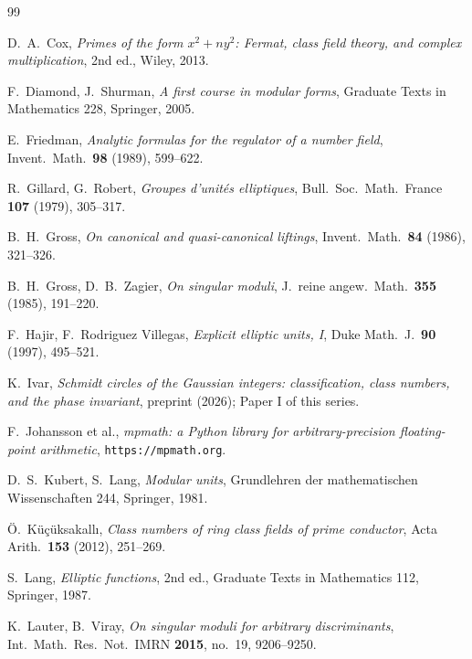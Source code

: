 \documentclass[11pt]{amsart}
\numberwithin{equation}{section}
\theoremstyle{plain}
\theoremstyle{definition}
\theoremstyle{remark}
\begin{document}
\begin{thebibliography}{99}

D.~A.~Cox,
\emph{Primes of the form $x^2 + ny^2$: Fermat, class field theory,
and complex multiplication},
2nd ed., Wiley, 2013.

F.~Diamond, J.~Shurman,
\emph{A first course in modular forms},
Graduate Texts in Mathematics 228, Springer, 2005.

E.~Friedman,
\emph{Analytic formulas for the regulator of a number field},
Invent.\ Math.\ \textbf{98} (1989), 599--622.

R.~Gillard, G.~Robert,
\emph{Groupes d'unit\'es elliptiques},
Bull.\ Soc.\ Math.\ France \textbf{107} (1979), 305--317.

B.~H.~Gross,
\emph{On canonical and quasi-canonical liftings},
Invent.\ Math.\ \textbf{84} (1986), 321--326.

B.~H.~Gross, D.~B.~Zagier,
\emph{On singular moduli},
J.\ reine angew.\ Math.\ \textbf{355} (1985), 191--220.

F.~Hajir, F.~Rodriguez Villegas,
\emph{Explicit elliptic units, I},
Duke Math.\ J.\ \textbf{90} (1997), 495--521.

K.~Ivar,
\emph{Schmidt circles of the Gaussian integers: classification, class
numbers, and the phase invariant},
preprint (2026); Paper I of this series.

F.~Johansson et al.,
\emph{mpmath: a Python library for arbitrary-precision floating-point
arithmetic}, \texttt{https://mpmath.org}.

D.~S.~Kubert, S.~Lang,
\emph{Modular units},
Grundlehren der mathematischen Wissenschaften 244, Springer, 1981.

\"O.~K\"u\c{c}\"uksakall{\i},
\emph{Class numbers of ring class fields of prime conductor},
Acta Arith.\ \textbf{153} (2012), 251--269.

S.~Lang,
\emph{Elliptic functions},
2nd ed., Graduate Texts in Mathematics 112, Springer, 1987.

K.~Lauter, B.~Viray,
\emph{On singular moduli for arbitrary discriminants},
Int.\ Math.\ Res.\ Not.\ IMRN \textbf{2015}, no.\ 19, 9206--9250.


\end{thebibliography}
\end{document}
